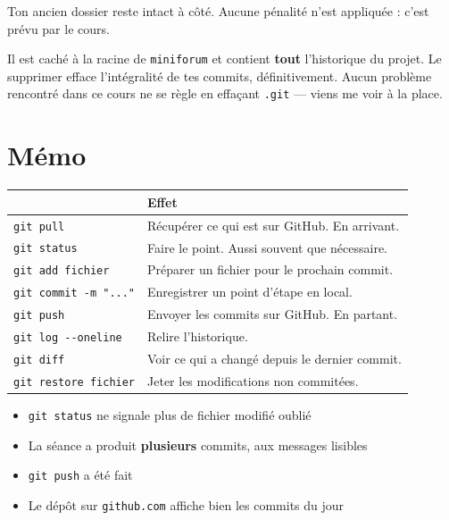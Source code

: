 \documentclass[a4paper,11pt]{article}
\newcommand{\hdr}[1]{\multicolumn{1}{l}{\color{white}\bfseries #1}}
\renewcommand{\arraystretch}{1.3}
\begin{document}
Ton ancien dossier reste intact à côté. Aucune pénalité n'est appliquée : c'est prévu par le cours.

\begin{tcolorbox}[interdit, title={Ne supprime jamais le dossier \texttt{.git}}]
Il est caché à la racine de \texttt{miniforum} et contient \textbf{tout} l'historique du projet. Le supprimer efface l'intégralité de tes commits, définitivement. Aucun problème rencontré dans ce cours ne se règle en effaçant \texttt{.git} --- viens me voir à la place.
\end{tcolorbox}

\newpage

\section{Mémo}

\begin{center}
\renewcommand{\arraystretch}{1.15}
\begin{tabularx}{\linewidth}{p{5.2cm}X}
  \toprule
  \rowcolor{uniNavy}
  \hdr{Commande} & \hdr{Effet} \\
  \midrule
  \rowcolor{uniPaper}
  \texttt{git pull} & Récupérer ce qui est sur GitHub. En arrivant. \\
  \texttt{git status} & Faire le point. Aussi souvent que nécessaire. \\
  \rowcolor{uniPaper}
  \texttt{git add fichier} & Préparer un fichier pour le prochain commit. \\
  \texttt{git commit -m "..."} & Enregistrer un point d'étape en local. \\
  \rowcolor{uniPaper}
  \texttt{git push} & Envoyer les commits sur GitHub. En partant. \\
  \texttt{git log -{}-oneline} & Relire l'historique. \\
  \rowcolor{uniPaper}
  \texttt{git diff} & Voir ce qui a changé depuis le dernier commit. \\
  \texttt{git restore fichier} & Jeter les modifications non commitées. \\
  \bottomrule
\end{tabularx}
\end{center}

\vspace{4pt}
\begin{tcolorbox}[definition, title={Réflexe de fin de séance}]
\begin{itemize}
  \item[$\square$] \texttt{git status} ne signale plus de fichier modifié oublié
  \item[$\square$] La séance a produit \textbf{plusieurs} commits, aux messages lisibles
  \item[$\square$] \texttt{git push} a été fait
  \item[$\square$] Le dépôt sur \texttt{github.com} affiche bien les commits du jour
\end{itemize}
\end{tcolorbox}
\end{document}

